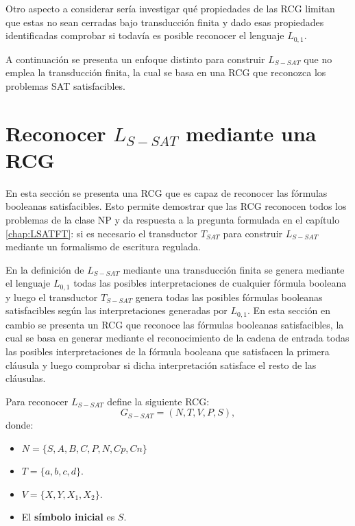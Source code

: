 Otro aspecto a considerar sería investigar qué propiedades de las RCG limitan que estas no sean cerradas
bajo transducción finita y dado esas propiedades identificadas comprobar si todavía es posible reconocer
el lenguaje $L_{0,1}$.

A continuación se presenta un enfoque distinto para construir $L_{S-SAT}$ que no emplea la transducción
finita, la cual se basa en una RCG que reconozca los problemas SAT satisfacibles.

\section{Reconocer $L_{S-SAT}$ mediante una RCG}

En esta sección se presenta una RCG que es capaz de reconocer las fórmulas booleanas satisfacibles. Esto permite demostrar que las
RCG reconocen todos los problemas de la clase NP y da respuesta a la pregunta formulada en el capítulo \ref{chap:LSATFT}: si es necesario
el transductor $T_{SAT}$ para construir $L_{S-SAT}$ mediante un formalismo de escritura regulada.

En la definición de $L_{S-SAT}$ mediante una transducción finita se genera mediante el lenguaje $L_{0,1}$
todas las posibles interpretaciones de cualquier fórmula booleana y luego el transductor $T_{S-SAT}$ genera
todas las posibles fórmulas booleanas satisfacibles según las interpretaciones generadas por $L_{0,1}$.
En esta sección en cambio se presenta un RCG que reconoce las fórmulas booleanas satisfacibles, la cual se
basa en generar mediante el reconocimiento de la cadena de entrada todas las posibles
interpretaciones de la fórmula booleana que satisfacen la primera cláusula y luego comprobar si dicha
interpretación satisface el resto de las cláusulas.


Para reconocer $L_{S-SAT}$ define la siguiente RCG:
\[
    G_{S-SAT} = (N, T, V, P, S),
\]
donde:

\begin{itemize}
    \item $N=\{S,A,B,C,P,N,Cp,Cn\}$
    \item $T=\{a,b,c,d\}$.
    \item $V=\{X,Y,X_1,X_2\}$.
    \item El \textbf{símbolo inicial} es $S$.
\end{itemize}

